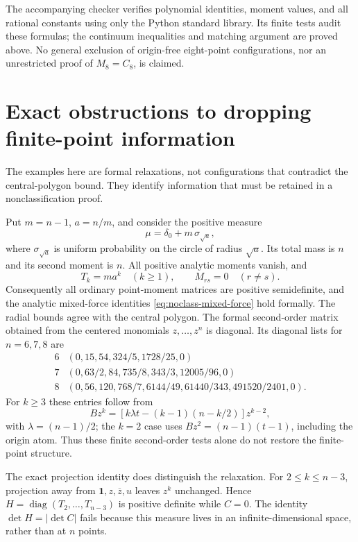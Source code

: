 \documentclass[11pt]{article}
\theoremstyle{remark}
\numberwithin{equation}{section}
\begin{document}
The accompanying checker verifies polynomial identities, moment
values, and all rational constants using only the Python standard
library. Its finite tests audit these formulas; the continuum
inequalities and matching argument are proved above. No general
exclusion of origin-free eight-point configurations, nor an
unrestricted proof of $M_8=C_8$, is claimed.

\section{Exact obstructions to dropping finite-point information}
\label{sec:noclass-relaxation}

The examples here are formal relaxations, not configurations that
contradict the central-polygon bound. They identify information that
must be retained in a nonclassification proof.

Put $m=n-1$, $a=n/m$, and consider the positive measure
\[
 \mu=\delta_0+m\,\sigma_{\sqrt a},
\]
where $\sigma_{\sqrt a}$ is uniform probability on the circle of
radius $\sqrt a$. Its total mass is $n$ and its second moment is $n$.
All positive analytic moments vanish, and
\[
 T_k=m a^k\quad(k\ge1),\qquad
 M_{rs}=0\quad(r\ne s).
\]
Consequently all ordinary point-moment matrices are positive
semidefinite, and the analytic mixed-force identities
\eqref{eq:noclass-mixed-force} hold formally. The radial bounds agree
with the central polygon. The formal second-order matrix obtained
from the centered monomials $z,\ldots,z^n$ is diagonal. Its diagonal
lists for $n=6,7,8$ are
\[
\begin{array}{c|l}
6&(0,15,54,324/5,1728/25,0)\\
7&(0,63/2,84,735/8,343/3,12005/96,0)\\
8&(0,56,120,768/7,6144/49,61440/343,491520/2401,0).
\end{array}
\]
For $k\ge3$ these entries follow from
\[
 Bz^k=\left[k\lambda t-(k-1)(n-k/2)\right]z^{k-2},
\]
with $\lambda=(n-1)/2$; the $k=2$ case uses
$Bz^2=(n-1)(t-1)$, including the origin atom.
Thus these finite second-order tests alone do not restore the
finite-point structure.

The exact projection identity does distinguish the relaxation.
For $2\le k\le n-3$, projection away from
$\mathbf1,z,\overline z,u$ leaves $z^k$ unchanged.
Hence $H=\operatorname{diag}(T_2,\ldots,T_{n-3})$ is positive
definite while $C=0$. The identity
$\det H=|\det C|$ fails because this measure lives in an
infinite-dimensional space, rather than at $n$ points.
\end{document}
